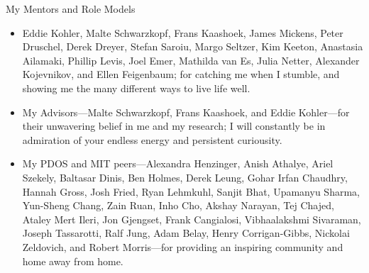 \begin{center}{My Mentors and Role Models}\end{center} 
    \begin{itemize} 
        \item Eddie Kohler, Malte Schwarzkopf, Frans Kaashoek, James
                Mickens, Peter Druschel, Derek Dreyer, Stefan Saroiu, Margo
                Seltzer, Kim Keeton, Anastasia Ailamaki, Phillip Levis, Joel
                Emer, Mathilda van Es, Julia Netter, Alexander Kojevnikov, and
                Ellen Feigenbaum; for catching me when I stumble, and showing me
                the many different ways to live life well.

        \item My Advisors---Malte Schwarzkopf, Frans Kaashoek, and Eddie
            Kohler---for their unwavering belief in me and my research; I will
            constantly be in admiration of your endless energy and persistent
            curiousity.

        \item My PDOS and MIT peers---Alexandra Henzinger, Anish Athalye,
            Ariel Szekely, Baltasar Dinis, Ben Holmes, Derek Leung, Gohar Irfan
            Chaudhry, Hannah Gross, Josh Fried, Ryan Lehmkuhl, Sanjit Bhat,
            Upamanyu Sharma, Yun-Sheng Chang, Zain Ruan, Inho Cho, Akshay
            Narayan, Tej Chajed, Ataley Mert Ileri, Jon Gjengset, Frank
            Cangialosi, Vibhaalakshmi Sivaraman, Joseph Tassarotti, Ralf Jung,
            Adam Belay, Henry Corrigan-Gibbs, Nickolai Zeldovich, and Robert
            Morris---for providing an inspiring community and home away from home.
    \end{itemize}
    
